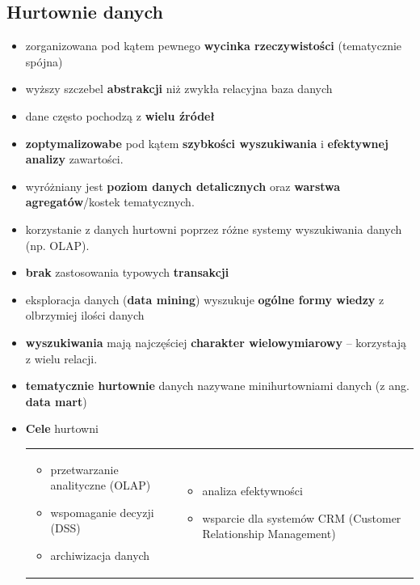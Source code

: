 \documentclass[a4paper]{article}
\begin{document}
    \subsection{Hurtownie danych}
    \begin{itemize}[noitemsep]
        \item zorganizowana pod kątem pewnego \textbf{wycinka rzeczywistości} (tematycznie spójna)
        \item wyższy szczebel \textbf{abstrakcji} niż zwykła relacyjna baza danych
        \item dane często pochodzą z \textbf{wielu źródeł}
        \item \textbf{zoptymalizowabe} pod kątem \textbf{szybkości wyszukiwania} i \textbf{efektywnej analizy}
        zawartości.
        \item wyróżniany jest \textbf{poziom danych detalicznych} oraz \textbf{warstwa
        agregatów}/kostek tematycznych.
        \item korzystanie z danych hurtowni poprzez różne systemy
        wyszukiwania danych (np. OLAP).
        \item \textbf{brak} zastosowania typowych \textbf{transakcji}
        \item eksploracja danych (\textbf{data mining}) wyszukuje \textbf{ogólne formy wiedzy} z olbrzymiej ilości
        danych
        \item \textbf{wyszukiwania} mają najczęściej \textbf{charakter wielowymiarowy} – korzystają z wielu relacji.
        \item \textbf{tematycznie hurtownie} danych nazywane minihurtowniami danych (z ang. \textbf{data mart})
        \item \textbf{Cele} hurtowni
        \begin{table}[H]
            \begin{center}
                \begin{tabular}{p{7cm} p{9cm}}
                    \begin{itemize}[noitemsep]
                        \item przetwarzanie analityczne (OLAP)
                        \item wspomaganie decyzji (DSS)
                        \item archiwizacja danych
                    \end{itemize}
                    &
                    \begin{itemize}[noitemsep]
                        \item analiza efektywności
                        \item wsparcie dla systemów CRM (Customer Relationship Management)
                    \end{itemize}
                \end{tabular}
            \end{center}
        \end{table}
    \end{itemize}
\end{document}
